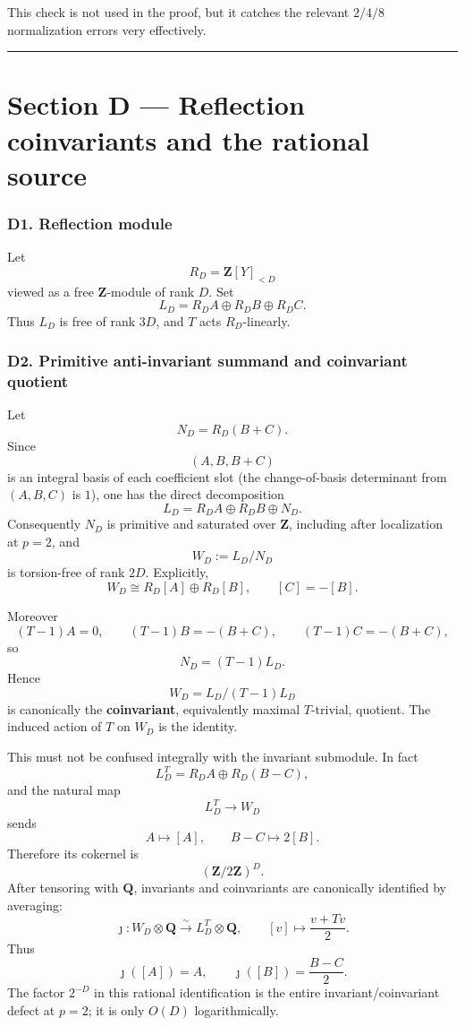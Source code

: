 \documentclass[
  10pt,
  letterpaper,
]{article}
\theoremstyle{definition}
\theoremstyle{remark}
\begin{document}
This check is not used in the proof, but it catches the relevant
\(2/4/8\) normalization errors very effectively.

\begin{center}\rule{0.5\linewidth}{0.5pt}\end{center}

\section{Section D --- Reflection coinvariants and the rational
source}\label{section-d-reflection-coinvariants-and-the-rational-source}

\subsubsection{D1. Reflection module}\label{d1.-reflection-module}

Let \[
R_D=\mathbf Z[Y]_{<D}
\] viewed as a free \(\mathbf Z\)-module of rank \(D\). Set \[
L_D=R_DA\oplus R_DB\oplus R_DC.
\] Thus \(L_D\) is free of rank \(3D\), and \(T\) acts \(R_D\)-linearly.

\subsubsection{D2. Primitive anti-invariant summand and coinvariant
quotient}\label{d2.-primitive-anti-invariant-summand-and-coinvariant-quotient}

Let \[
N_D=R_D(B+C).
\] Since \[
(A,B,B+C)
\] is an integral basis of each coefficient slot (the change-of-basis
determinant from \((A,B,C)\) is \(1\)), one has the direct decomposition
\[
L_D=R_DA\oplus R_DB\oplus N_D.
\] Consequently \(N_D\) is primitive and saturated over \(\mathbf Z\),
including after localization at \(p=2\), and \[
W_D:=L_D/N_D
\] is torsion-free of rank \(2D\). Explicitly, \[
W_D\cong R_D[A]\oplus R_D[B],
\qquad [C]=-[B].
\]

Moreover \[
(T-1)A=0,\qquad (T-1)B=-(B+C),\qquad (T-1)C=-(B+C),
\] so \[
N_D=(T-1)L_D.
\] Hence \[
\boxed{W_D=L_D/(T-1)L_D}
\] is canonically the \textbf{coinvariant}, equivalently maximal
\(T\)-trivial, quotient. The induced action of \(T\) on \(W_D\) is the
identity.

This must not be confused integrally with the invariant submodule. In
fact \[
L_D^T=R_DA\oplus R_D(B-C),
\] and the natural map \[
L_D^T\longrightarrow W_D
\] sends \[
A\longmapsto[A],\qquad B-C\longmapsto2[B].
\] Therefore its cokernel is \[
(\mathbf Z/2\mathbf Z)^D.
\] After tensoring with \(\mathbf Q\), invariants and coinvariants are
canonically identified by averaging: \[
\boxed{
\jmath:W_D\otimes\mathbf Q\xrightarrow{\sim}L_D^T\otimes\mathbf Q,
\qquad
[v]\longmapsto\frac{v+Tv}{2}.
}
\] Thus \[
\jmath([A])=A,
\qquad
\jmath([B])=\frac{B-C}{2}.
\] The factor \(2^{-D}\) in this rational identification is the entire
invariant/coinvariant defect at \(p=2\); it is only \(O(D)\)
logarithmically.
\end{document}
